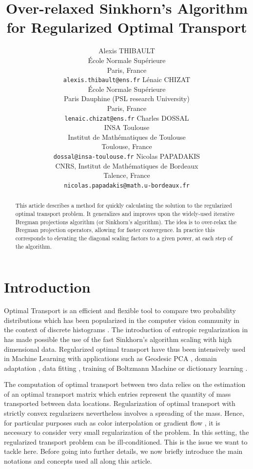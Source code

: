 \documentclass{article} %
\title{Over-relaxed Sinkhorn's Algorithm for Regularized Optimal Transport}
\author{
Alexis THIBAULT\\
\'Ecole Normale Sup\'erieure\\
Paris, France\\
\texttt{alexis.thibault@ens.fr}
 \And
L\'enaic CHIZAT\\
\'Ecole Normale Sup\'erieure\\ Paris Dauphine (PSL research University)\\
Paris, France\\
\texttt{lenaic.chizat@ens.fr}
 \AND
Charles DOSSAL\\
INSA Toulouse\\
Institut de Math\'ematiques de Toulouse\\
Toulouse,  France\\
\texttt{dossal@insa-toulouse.fr}
\And 
Nicolas PAPADAKIS\\
CNRS, Institut de Math\'ematiques de Bordeaux\\
Talence, France\\
\texttt{nicolas.papadakis@math.u-bordeaux.fr}
}
\theoremstyle{plain}
\theoremstyle{definition}
\theoremstyle{remark}
\begin{document}
\maketitle

\begin{abstract}
This article describes a method for quickly calculating the solution to the regularized optimal transport problem. It generalizes and improves upon the widely-used iterative Bregman projections algorithm (or Sinkhorn's algorithm). The idea is to over-relax the Bregman projection operators, allowing for faster convergence. In practice this corresponds to elevating the diagonal scaling factors to a given power, at each step of the algorithm.
\end{abstract}

\section{Introduction}
Optimal Transport is an efficient and flexible tool to compare two probability distributions which has been popularized in the computer vision community in the context of discrete histograms \cite{Rubner2000}. The introduction of entropic regularization in \cite{cuturi13} has made possible the use of the fast Sinkhorn's algorithm \cite{sinkhorn64}   scaling with high dimensional data. 
Regularized optimal transport have thus been intensively used  in  Machine Learning with applications such as   Geodesic PCA \cite{seguy2015principal}, domain adaptation \cite{2015arXiv150700504C}, data fitting \cite{2015arXiv150605439F},  training of Boltzmann Machine \cite{NIPS2016_6248}  or dictionary learning \cite{Rolet2016,2017arXiv170801955S}.

The computation of optimal transport between two data relies on the estimation of an optimal transport matrix which entries represent the quantity of mass transported between  data locations. 
Regularization of optimal transport with strictly convex regularizers \cite{cuturi13, dessein2016}  nevertheless involves a spreading of the mass. Hence, for particular purposes such as color interpolation \cite{Rabin2014} or gradient flow \cite{2016arXiv160705816C}, it is  necessary  to consider very small regularization of the problem.
In this setting,  the regularized transport problem can be ill-conditioned. This is the issue  we want to tackle here.
Before going into further details, we now briefly introduce the main notations and concepts used all along this article.

 
\end{document}
